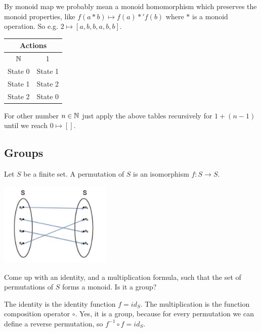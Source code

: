 \documentclass{article}
\begin{document}
By monoid map we probably mean a monoid homomorphism which preserves the monoid
properties, like $f(a * b) \mapsto f(a) *' f(b)$ where $*$ is a monoid
operation. So e.g.  $2 \mapsto [a, b, b, a, b, b]$.

\begin{center}
\begin{tabular}{|c||c|}
\hline
\multicolumn{2}{|c|}{Actions} \\
\hline
$\mathbb{N}$ & 1 \\
\hline
State 0& State 1\\
\hline
State 1& State 2\\
\hline
State 2& State 0\\
\hline
\end{tabular}
\end{center}

For other number $n \in \mathbb{N}$ just apply the above tables recursively for $1 +
(n-1)$ until we reach $0 \mapsto []$.

\subsection{Groups}


Let \( S \) be a finite set. A permutation of \( S \) is an isomorphism \( f : S
\to S \).

\begin{center}
\includegraphics[width=0.4\textwidth]{img/ex3217.png}
\end{center}

\es Come up with an identity, and a multiplication formula, such that the set of
    permutations of \( S \) forms a monoid.
\ei Is it a group?
\ee

\ans

\es The identity is the identity function $f = id_S$. The multiplication is the
    function composition operator $\circ$.
\ei Yes, it is a group, because for every permutation we can define a reverse
    permutation, so $f^{-1} \circ f = id_S$.
\ee

\end{document}
